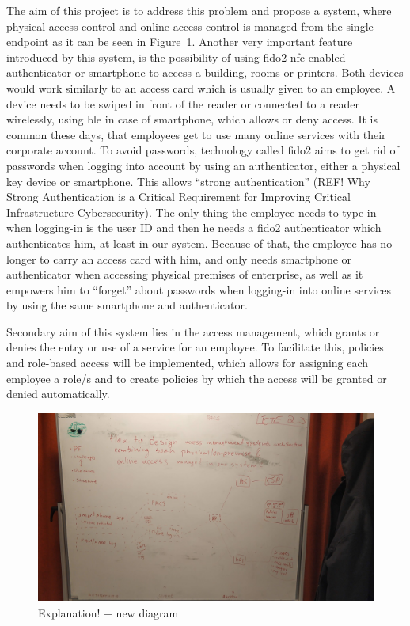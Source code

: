 The aim of this project is to address this problem and propose a system, where physical access control and online access control is managed from the single endpoint as it can be seen in Figure~\ref{fig:IntroArchitecture}. Another very important feature introduced by this system, is the possibility of using \acrshort{fido}2 \acrshort{nfc} enabled authenticator or smartphone to access a building, rooms or printers. Both devices would work similarly to an access card which is usually given to an employee. A device needs to be swiped in front of the reader or connected to a reader wirelessly, using \acrshort{ble} in case of smartphone, which allows or deny access. It is common these days, that employees get to use many online services with their corporate account. To avoid passwords, technology called \acrshort{fido}2 aims to get rid of passwords when logging into account by using an authenticator, either a physical key device or smartphone. This allows “strong authentication” (REF! Why Strong Authentication is a Critical Requirement for Improving Critical Infrastructure Cybersecurity). The only thing the employee needs to type in when logging-in is the user ID and then he needs a \acrshort{fido}2 authenticator which authenticates him, at least in our system. Because of that, the employee has no longer to carry an access card with him, and only needs smartphone or authenticator when accessing physical premises of enterprise, as well as it empowers him to “forget” about passwords when logging-in into online services by using the same smartphone and authenticator.

Secondary aim of this system lies in the access management, which grants or denies the entry or use of a service for an employee. To facilitate this, policies and role-based access will be implemented, which allows for assigning each employee a role/s and to create policies by which the access will be granted or denied automatically.

\begin{figure}[ht]
    \centering
    \includegraphics[width=.95\textwidth]{00images/IntroArchitecture}
    \caption{Explanation! + new diagram}
    \label{fig:IntroArchitecture}
\end{figure}

